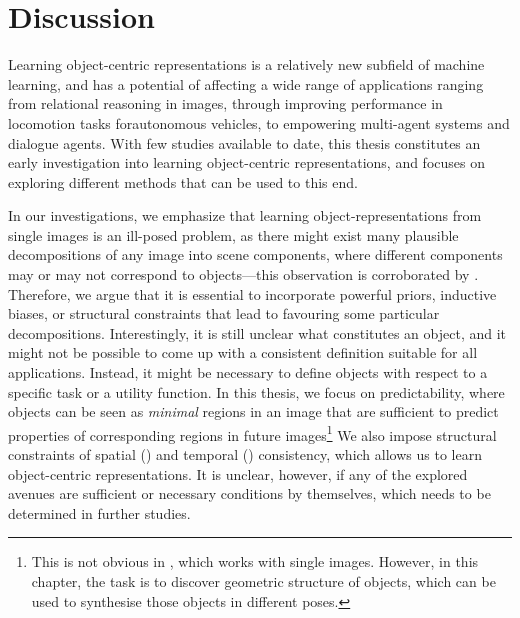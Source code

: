 \chapter{Discussion}
\label{ch:discussion}


Learning object-centric representations is a relatively new subfield of machine learning, and has a potential of affecting a wide range of applications ranging from relational reasoning in images, through improving performance in locomotion tasks for\eg autonomous vehicles, to empowering multi-agent systems and dialogue agents.
With few studies available to date, this thesis constitutes an early investigation into learning object-centric representations, and focuses on exploring different methods that can be used to this end.

In our investigations, we emphasize that learning object-representations from single images is an ill-posed problem, as there might exist many plausible decompositions of any image into scene components, where different components may or may not correspond to objects---this observation is corroborated by \cite{Burgess2019monet,Greff2019multi,Engelcke2019genesis}.
Therefore, we argue that it is essential to incorporate powerful priors, inductive biases, or structural constraints that lead to favouring some particular decompositions.
Interestingly, it is still unclear what constitutes an object, and it might not be possible to come up with a consistent definition suitable for all applications.
Instead, it might be necessary to define objects with respect to a specific task or a utility function.
In this thesis, we focus on predictability, where objects can be seen as \textit{minimal} regions in an image that are sufficient to predict properties of corresponding regions in future images\footnote{This is not obvious in , which works with single images. However, in this chapter, the task is to discover geometric structure of objects, which can be used to synthesise those objects in different poses.}
We also impose structural constraints of spatial () and temporal () consistency, which allows us to learn object-centric representations.
It is unclear, however, if any of the explored avenues are sufficient or necessary conditions by themselves, which needs to be determined in further studies. 

